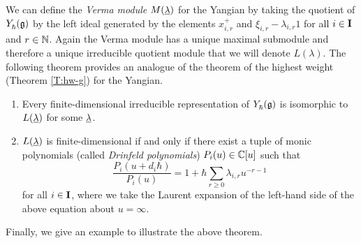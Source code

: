 We can define the \emph{Verma module} $M(\underline{\lambda})$ for the Yangian by taking the quotient of $Y_\hbar^{}(\mathfrak{g})$ by the left ideal generated by the elements $x^+_{i,r}$ and $\xi_{i,r}-\lambda_{i,r}1$ for all $i\in\mathbf{I}$ and $r\in\mathbb{N}$.
Again the Verma module has a unique maximal submodule and therefore a unique irreducible quotient module that we will denote $L(\lambda)$.
The following theorem provides an analogue of the theorem of the highest weight (Theorem \ref{T:hw-g}) for the Yangian.

\begin{theorem}\label{T:hw-Y}
    \begin{enumerate}
        \item Every finite-dimensional irreducible representation of $Y_\hbar^{}(\mathfrak{g})$ is isomorphic to $L(\underline{\lambda})$ for some $\underline{\lambda}$.
        \item $L(\underline{\lambda})$ is finite-dimensional if and only if there exist a tuple of monic polynomials (called \emph{Drinfeld polynomials}) $P_i(u)\in\mathbb{C}[u]$ such that
        \[\frac{P_i(u+d_i\hbar)}{P_i(u)} = 1+\hbar\sum_{r\geq 0}\lambda_{i,r}u^{-r-1}\]
        for all $i\in\mathbf{I}$, where we take the Laurent expansion of the left-hand side of the above equation about $u=\infty$.
    \end{enumerate}
\end{theorem}

Finally, we give an example to illustrate the above theorem.

